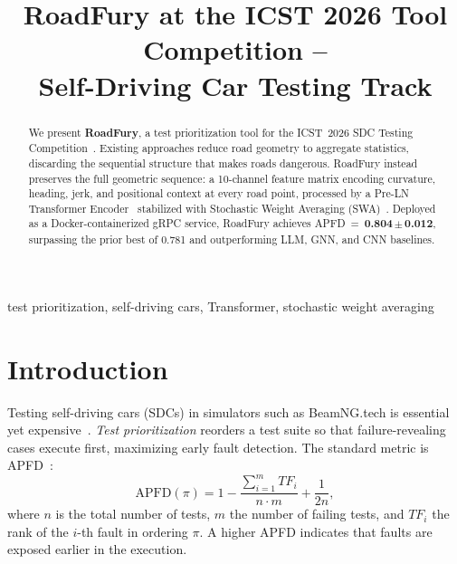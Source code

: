 \documentclass[conference]{IEEEtran}
\begin{document}
\title{RoadFury at the ICST 2026 Tool Competition --\\Self-Driving Car Testing Track}

\author{
}
\maketitle

\begin{abstract}
We present \textbf{RoadFury}, a test prioritization tool for the ICST~2026 SDC Testing Competition~\cite{b8}.
Existing approaches reduce road geometry to aggregate statistics, discarding the sequential structure that makes roads dangerous.
RoadFury instead preserves the full geometric sequence: a 10-channel feature matrix encoding curvature, heading, jerk, and positional context at every road point, processed by a Pre-LN Transformer Encoder~\cite{b11} stabilized with Stochastic Weight Averaging (SWA)~\cite{b6}.
Deployed as a Docker-containerized gRPC service, RoadFury achieves APFD~=~\textbf{0.804\,$\pm$\,0.012}, surpassing the prior best of 0.781 and outperforming LLM, GNN, and CNN baselines.
\end{abstract}

\begin{IEEEkeywords}
test prioritization, self-driving cars, Transformer, stochastic weight averaging
\end{IEEEkeywords}

\section{Introduction}

Testing self-driving cars (SDCs) in simulators such as BeamNG.tech is essential yet expensive~\cite{b1,b2}.
\emph{Test prioritization} reorders a test suite so that failure-revealing cases execute first, maximizing early fault detection.
The standard metric is APFD~\cite{b4}:
\begin{equation}
\text{APFD}(\pi) = 1 - \frac{\sum_{i=1}^{m} TF_i}{n \cdot m} + \frac{1}{2n},
\end{equation}
where $n$ is the total number of tests, $m$ the number of failing tests, and $TF_i$ the rank of the $i$-th fault in ordering $\pi$.
A higher APFD indicates that faults are exposed earlier in the execution.
\end{document}
